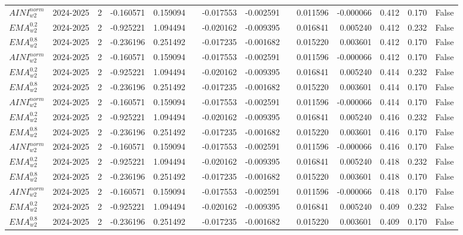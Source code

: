 \begin{tabular}{@{}llrrrrrrrrrlll@{}}
$AINI^{norm}_{w2}$ & 2024-2025 & 2 & -0.160571 & 0.159094 &  & -0.017553 & -0.002591 &  & 0.011596 & -0.000066 & 0.412 & 0.170 & False \\
$EMA^{0.2}_{w2}$ & 2024-2025 & 2 & -0.925221 & 1.094494 &  & -0.020162 & -0.009395 &  & 0.016841 & 0.005240 & 0.412 & 0.232 & False \\
$EMA^{0.8}_{w2}$ & 2024-2025 & 2 & -0.236196 & 0.251492 &  & -0.017235 & -0.001682 &  & 0.015220 & 0.003601 & 0.412 & 0.170 & False \\
$AINI^{norm}_{w2}$ & 2024-2025 & 2 & -0.160571 & 0.159094 &  & -0.017553 & -0.002591 &  & 0.011596 & -0.000066 & 0.412 & 0.170 & False \\
$EMA^{0.2}_{w2}$ & 2024-2025 & 2 & -0.925221 & 1.094494 &  & -0.020162 & -0.009395 &  & 0.016841 & 0.005240 & 0.414 & 0.232 & False \\
$EMA^{0.8}_{w2}$ & 2024-2025 & 2 & -0.236196 & 0.251492 &  & -0.017235 & -0.001682 &  & 0.015220 & 0.003601 & 0.414 & 0.170 & False \\
$AINI^{norm}_{w2}$ & 2024-2025 & 2 & -0.160571 & 0.159094 &  & -0.017553 & -0.002591 &  & 0.011596 & -0.000066 & 0.414 & 0.170 & False \\
$EMA^{0.2}_{w2}$ & 2024-2025 & 2 & -0.925221 & 1.094494 &  & -0.020162 & -0.009395 &  & 0.016841 & 0.005240 & 0.416 & 0.232 & False \\
$EMA^{0.8}_{w2}$ & 2024-2025 & 2 & -0.236196 & 0.251492 &  & -0.017235 & -0.001682 &  & 0.015220 & 0.003601 & 0.416 & 0.170 & False \\
$AINI^{norm}_{w2}$ & 2024-2025 & 2 & -0.160571 & 0.159094 &  & -0.017553 & -0.002591 &  & 0.011596 & -0.000066 & 0.416 & 0.170 & False \\
$EMA^{0.2}_{w2}$ & 2024-2025 & 2 & -0.925221 & 1.094494 &  & -0.020162 & -0.009395 &  & 0.016841 & 0.005240 & 0.418 & 0.232 & False \\
$EMA^{0.8}_{w2}$ & 2024-2025 & 2 & -0.236196 & 0.251492 &  & -0.017235 & -0.001682 &  & 0.015220 & 0.003601 & 0.418 & 0.170 & False \\
$AINI^{norm}_{w2}$ & 2024-2025 & 2 & -0.160571 & 0.159094 &  & -0.017553 & -0.002591 &  & 0.011596 & -0.000066 & 0.418 & 0.170 & False \\
$EMA^{0.2}_{w2}$ & 2024-2025 & 2 & -0.925221 & 1.094494 &  & -0.020162 & -0.009395 &  & 0.016841 & 0.005240 & 0.409 & 0.232 & False \\
$EMA^{0.8}_{w2}$ & 2024-2025 & 2 & -0.236196 & 0.251492 &  & -0.017235 & -0.001682 &  & 0.015220 & 0.003601 & 0.409 & 0.170 & False \\

\end{tabular}
